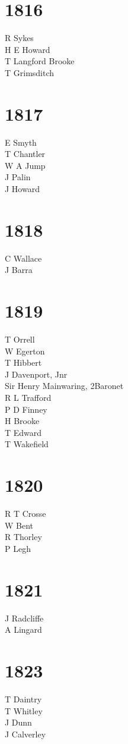 \begin{multicols}{2}
  \section*{1816}
  R Sykes \\
  H E Howard \\
  T Langford Brooke \\
  T Grimsditch \\
  \section*{1817}
  E Smyth \\
  T Chantler \\
  W A Jump \\
  J Palin \\
  J Howard \\
  \section*{1818}
  C Wallace \\
  J Barra \\
  \section*{1819}
  T Orrell \\
  W Egerton \\
  T Hibbert \\
  J Davenport, Jnr \\
  Sir Henry Mainwaring, 2\nd Baronet \\
  R L Trafford \\
  P D Finney \\
  H Brooke \\
  T Edward \\
  T Wakefield \\
  \section*{1820}
  R T Crosse \\
  W Bent \\
  R Thorley \\
  P Legh \\
  \section*{1821}
  J Radcliffe \\
  A Lingard \\
  \section*{1823}
  T Daintry \\
  T Whitley \\
  J Dunn \\
  J Calverley \\

\end{multicols}
